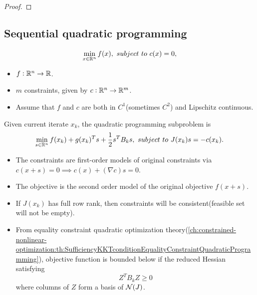 \begin{refsection}
\begin{proof}
\end{proof}

\subsection{Sequential quadratic programming}

\begin{definition}
	$$\min_{x\in\mathbb{R}^n} f(x), ~subject~to~c(x) = 0,$$
	\begin{itemize}
		\item $f:\mathbb{R}^n\to \mathbb{R}$.
		\item $m$ constraints, given by $c: \mathbb{R}^n \to \mathbb{R}^m$.
		\item Assume that $f$ and $c$ are both in $C^1$(sometimes $C^2$) and Lipschitz continuous.
	\end{itemize}
\end{definition}


\begin{definition}
Given current iterate $x_k$, the quadratic programming subproblem is
	$$\min_{s\in\mathbb{R}^n} f(x_k) + g(x_k)^Ts + \frac{1}{2}s^TB_ks, ~subject~to~ J(x_k)s = -c(x_k).$$
\end{definition}


\begin{remark}[interpretation]\hfill
\begin{itemize}
	\item The constraints are first-order models of original constraints via $c(x+s) = 0 \implies c(x) + (\nabla c) s = 0.$
	\item The objective is the second order model of the original objective $f(x+s)$.
\end{itemize}
\end{remark}


\begin{remark}\hfill
	\begin{itemize}
		\item If $J(x_k)$ has full row rank, then constraints will be consistent(feasible set will not be empty).
		\item From equality constraint quadratic optimization theory(\autoref{ch:constrained-nonlinear-optimization:th:SufficiencyKKTconditionEqualityConstraintQuadraticProgramming}), objective function is bounded below if the reduced Hessian satisfying
		$$Z^TB_kZ \geq 0 $$
		where columns of $Z$ form a basis of $\mathcal{N}(J)$.
	\end{itemize}
\end{remark}



\end{refsection}
